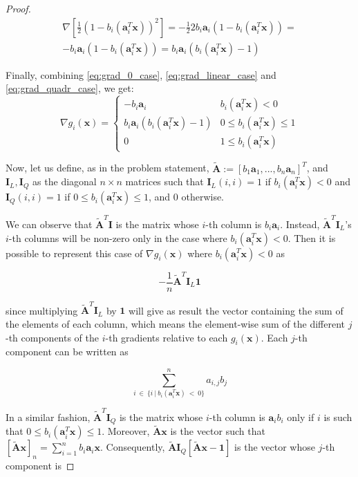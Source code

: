 \documentclass[12pt]{article}
\newcommand{\xb}{\mathbf{x}}
\newcommand{\ab}{\mathbf{a}}
\newcommand{\abi}{\ab_i}
\newcommand{\sumin}{\sum_{i = 1}^n}
\newcommand{\ax}{\abi^T\xb}
\newcommand{\atilde}{\mathbf{\tilde{A}}}
\newcommand{\id}{\mathbf{I}}
\newcommand{\ones}{\mathbf{1}}
\begin{document}
\begin{proof}
\begin{gather}
    \nabla \left [\frac{1}{2}(1 - b_i(\ax))^2\right] = \nonumber
    -\frac{1}{2} 2 b_i\abi(1 - b_i(\ax)) = \\ \label{eq:grad_quadr_case}
    -b_i\abi(1 - b_i(\ax)) = b_i\abi(b_i(\ax) - 1)
\end{gather}

Finally, combining \eqref{eq:grad_0_case}, \eqref{eq:grad_linear_case} and \eqref{eq:grad_quadr_case}, we get:
\begin{equation}
    \nabla g_i(\xb) = \begin{cases}
            -b_i\abi                & b_i(\ax) < 0 \\
            b_i\abi(b_i(\ax) - 1)   & 0 \leq b_i(\ax) \leq 1 \\
            0                       & 1 \le b_i(\ax)
    \end{cases}
\end{equation}

Now, let us define, as in the problem statement, $\atilde:=[b_1\ab_1, ..., b_n\ab_n]^T$, and $\id_L, \id_Q$ as the diagonal $n \times n$ matrices such that $\id_L(i,i) = 1$ if $b_i(\ax) < 0$ and $\id_Q(i,i) = 1$ if $0 \leq b_i(\ax) \leq 1$, and $0$ otherwise.

We can observe that $\atilde^T\id$ is the matrix whose $i$-th column is $b_i\abi$. Instead, $\atilde^T\id_L$'s $i$-th columns will be non-zero only in the case where $b_i(\ax) < 0$. Then it is possible to represent this case of $\nabla g_i(\xb)$ where $b_i(\ax) < 0$ as

\begin{equation} \label{eq:grad_matrix_linear_case}
    -\frac{1}{n}\atilde^T\id_L\ones
\end{equation}

since multiplying $\atilde^T\id_L$ by $\ones$ will give as result the vector containing the sum of the elements of each column, which means the element-wise sum of the different $j$-th components of the $i$-th gradients relative to each $g_i(\xb)$. Each $j$-th component can be written as

\begin{equation*}
    \sum_{i \ \in \ \{i \ | \ b_i(\ax) \ < \ 0\}}^{n} a_{i,j} b_j
\end{equation*}

In a similar fashion, $\atilde^T\id_Q$ is the matrix whose $i$-th column is $\abi b_i$ only if $i$ is such that $0 \leq b_i(\ax) \leq 1$. Moreover, $\atilde \xb$ is the vector such that $[\atilde \xb]_n = \sumin b_i\abi\xb$. Consequently, $\atilde\id_Q[\atilde \xb - \ones]$ is the vector whose $j$-th component is


\end{proof}
\end{document}
